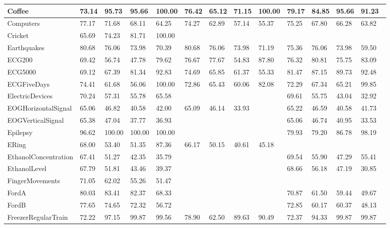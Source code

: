 \begin{landscape}
\begin{longtable}{|l|llll|llll|llll|}
      Coffee & 73.14 & 95.73 & 95.66 & 100.00 & 76.42 & 65.12 & 71.15 & 100.00 & 79.17 & 84.85 & 95.66 & 91.23 \\ \hline
      Computers & 77.17 & 71.68 & 68.11 & 64.25 & 74.27 & 62.89 & 57.14 & 55.37 & 75.25 & 67.80 & 66.28 & 63.82 \\ \hline
      Cricket & 65.69 & 74.23 & 81.71 & 100.00 &   &   &   &   &   &   &   &   \\ \hline
      Earthquakes & 80.68 & 76.06 & 73.98 & 70.39 & 80.68 & 76.06 & 73.98 & 71.19 & 75.36 & 76.06 & 73.98 & 59.50 \\ \hline
      ECG200 & 69.42 & 56.74 & 47.78 & 79.62 & 76.67 & 77.67 & 54.83 & 87.80 & 76.32 & 80.81 & 75.75 & 83.09 \\ \hline
      ECG5000 & 69.12 & 67.39 & 81.34 & 92.83 & 74.69 & 65.85 & 61.37 & 55.33 & 81.47 & 87.15 & 89.73 & 92.48 \\ \hline
      ECGFiveDays & 74.41 & 61.68 & 56.06 & 100.00 & 72.86 & 65.43 & 60.06 & 82.08 & 72.29 & 67.34 & 65.21 & 99.85 \\ \hline
      ElectricDevices & 70.24 & 57.31 & 55.78 & 65.58 &   &   &   &   & 69.61 & 55.75 & 43.04 & 32.92 \\ \hline
      EOGHorizontalSignal & 65.06 & 46.82 & 40.58 & 42.00 & 65.09 & 46.14 & 33.93 &   & 65.22 & 46.59 & 40.58 & 41.73 \\ \hline
      EOGVerticalSignal & 65.38 & 47.04 & 37.77 & 36.93 &   &   &   &   & 65.06 & 46.74 & 40.95 & 33.53 \\ \hline
      Epilepsy & 96.62 & 100.00 & 100.00 & 100.00 &   &   &   &   & 79.93 & 79.20 & 86.78 & 98.19 \\ \hline
      ERing & 68.00 & 53.40 & 51.35 & 87.36 & 66.17 & 50.15 & 40.61 & 45.18 &   &   &   &   \\ \hline
      EthanolConcentration & 67.41 & 51.27 & 42.35 & 35.79 &   &   &   &   & 69.54 & 55.90 & 47.29 & 55.41 \\ \hline
      EthanolLevel & 67.79 & 51.81 & 43.46 & 39.37 &   &   &   &   & 68.66 & 56.18 & 47.19 & 30.85 \\ \hline
      FingerMovements & 71.05 & 62.02 & 55.26 & 51.47 &   &   &   &   &   &   &   &   \\ \hline
      FordA & 80.03 & 83.41 & 82.37 & 68.33 &   &   &   &   & 70.87 & 61.50 & 59.44 & 49.67 \\ \hline
      FordB & 77.65 & 74.65 & 72.32 & 56.72 &   &   &   &   & 72.85 & 60.17 & 60.37 & 48.13 \\ \hline
      FreezerRegularTrain & 72.22 & 97.15 & 99.87 & 99.56 & 78.90 & 62.50 & 89.63 & 90.49 & 72.37 & 94.33 & 99.87 & 99.87 \\ \hline

\end{longtable}
\end{landscape}
